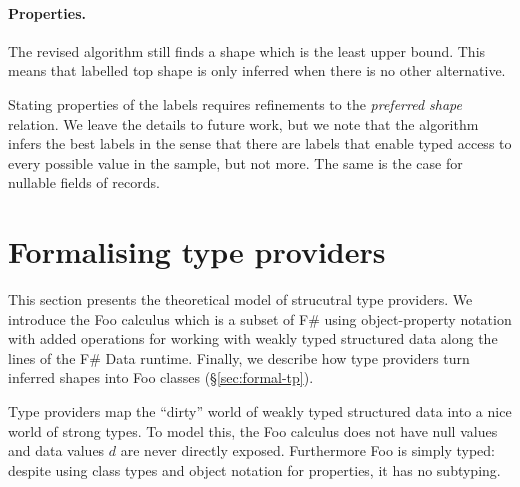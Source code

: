 \documentclass[10pt,preprint,blind,clearpagebib]{sigplanconf}
\newcommand{\kvd}[1]{\textnormal{\textcolor{kvdclr}{\sffamily #1}}}
\begin{document}
\paragraph{Properties.}
The revised algorithm still finds a shape which is the least upper bound. This means that 
labelled top shape is only inferred when there is no other alternative.

Stating properties of the labels requires refinements to the \emph{preferred shape} relation.
We leave the details to future work, but we
note that the algorithm infers the best labels in the sense that there are labels that enable 
typed access to every possible value in the sample, but not more. The same is the case for nullable
fields of records.


% 
%

\section{Formalising type providers}
\label{sec:formal}

This section presents the theoretical model of strucutral type providers. We introduce the Foo calculus 
which is a subset of F\# using object-property notation with
added operations for working with weakly typed structured data along the lines of the F\# Data runtime. Finally, we describe how 
type providers turn inferred shapes into Foo classes (\S\ref{sec:formal-tp}).

Type providers map the ``dirty'' world of weakly typed structured data into a nice world of strong types. To model this, the Foo calculus
does not have \kvd{null} values and data values $d$ are never directly exposed.  
Furthermore Foo is simply typed: despite using class types and object notation 
for properties, it has no subtyping.
\end{document}
